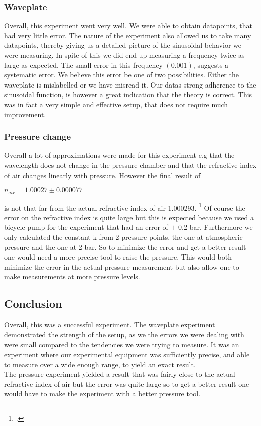 \documentclass[working, oneside]{inputs/tuftebook}
\begin{document}
\subsubsection*{Waveplate} Overall, this experiment went very well. We were able to obtain datapoints, that had very little error. The nature of the experiment also allowed us to take many datapoints, thereby giving us a detailed picture of the sinusoidal behavior we were measuring. In spite of this we did end up measuring a frequency twice as large as expected. The small error in this frequency $(0.001)$, suggests a systematic error. We believe this error be one of two possibilities. Either the waveplate is mislabelled or we have misread it. Our datas strong adherence to the sinusoidal function, is however a great indication that the theory is correct. This was in fact a very simple and effective setup, that does not require much improvement.
\subsubsection*{Pressure change}
Overall a lot of approximations were made for this experiment e.g that the wavelength does not change in the pressure chamber and that the refractive index of air changes linearly with pressure. However the final result of 
\begin{center}
$n_{air} = 1.00027 \pm 0.000077$
\end{center}

is not that far from the actual refractive index of air 1.000293. \footcite{https://hypertextbook.com/facts/2005/MayaBarsky.shtml} Of course the error on the refractive index is quite large but this is expected because we used a bicycle pump for the experiment that had an error of $\pm$ 0.2 bar. Furthermore we only calculated the constant k from 2  pressure points, the one at atmospheric pressure and the one at 2 bar. So to minimize the error and get a better result one would need a more precise tool to raise the pressure. This would both minimize the error in the actual pressure measurement but also allow one to make measurements at more pressure levels.

\subsection*{Conclusion}
Overall, this was a successful experiment. The waveplate experiment demonstrated the strength of the setup, as we the errors we were dealing with were small compared to the tendencies we were trying to measure. It was an experiment where our experimental equipment was sufficiently precise, and able to measure over a wide enough range, to yield an exact result. \\
The pressure experiment yielded a result that was fairly close to the actual refractive index of air but the error was quite large so to get a better result one would have to make the experiment with a better pressure tool.
 
\end{document}
